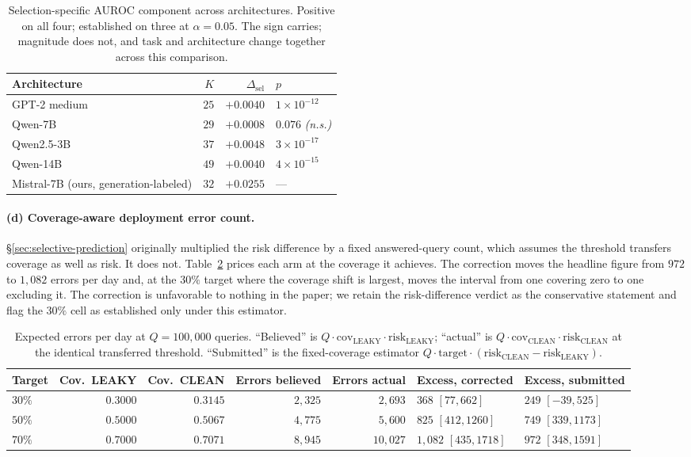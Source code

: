 \documentclass{article}
\begin{document}
\begin{table}[h]
\centering
\small
\begin{tabular}{@{}lrrl@{}}
\toprule
Architecture & $K$ & $\Delta_\text{sel}$ & $p$ \\
\midrule
GPT-2 medium & $25$ & $+0.0040$ & $1{\times}10^{-12}$ \\
Qwen-7B      & $29$ & $+0.0008$ & $0.076$ \emph{(n.s.)} \\
Qwen2.5-3B   & $37$ & $+0.0048$ & $3{\times}10^{-17}$ \\
Qwen-14B     & $49$ & $+0.0040$ & $4{\times}10^{-15}$ \\
\midrule
Mistral-7B (ours, generation-labeled) & $32$ & $+0.0255$ & --- \\
\bottomrule
\end{tabular}
\caption{Selection-specific AUROC component across architectures. Positive on
all four; established on three at $\alpha=0.05$. The sign carries; magnitude
does not, and task and architecture change together across this comparison.}
\label{tab:arch}
\end{table}

\paragraph{(d) Coverage-aware deployment error count.}
\S\ref{sec:selective-prediction} originally multiplied the risk difference by a
fixed answered-query count, which assumes the threshold transfers coverage as
well as risk. It does not. Table~\ref{tab:deploy} prices each arm at the
coverage it achieves. The correction moves the headline figure from $972$ to
$1{,}082$ errors per day and, at the $30\%$ target where the coverage shift is
largest, moves the interval from one covering zero to one excluding it. The
correction is unfavorable to nothing in the paper; we retain the
risk-difference verdict as the conservative statement and flag the $30\%$ cell
as established only under this estimator.

\begin{table}[h]
\centering
\small
{\setlength{\tabcolsep}{4pt}
\begin{tabular}{@{}lrrrrll@{}}
\toprule
Target & Cov.\ LEAKY & Cov.\ CLEAN & Errors believed & Errors actual & Excess, corrected & Excess, submitted \\
\midrule
$30\%$ & $0.3000$ & $0.3145$ & $2{,}325$ & $2{,}693$ & $368$ $[77,662]$ & $249$ $[-39,525]$ \\
$50\%$ & $0.5000$ & $0.5067$ & $4{,}775$ & $5{,}600$ & $825$ $[412,1260]$ & $749$ $[339,1173]$ \\
$70\%$ & $0.7000$ & $0.7071$ & $8{,}945$ & $10{,}027$ & $1{,}082$ $[435,1718]$ & $972$ $[348,1591]$ \\
\bottomrule
\end{tabular}}
\caption{Expected errors per day at $Q=100{,}000$ queries. ``Believed'' is
$Q\cdot\text{cov}_\text{LEAKY}\cdot\text{risk}_\text{LEAKY}$; ``actual'' is
$Q\cdot\text{cov}_\text{CLEAN}\cdot\text{risk}_\text{CLEAN}$ at the identical
transferred threshold. ``Submitted'' is the fixed-coverage estimator
$Q\cdot\text{target}\cdot(\text{risk}_\text{CLEAN}-\text{risk}_\text{LEAKY})$.}
\label{tab:deploy}
\end{table}
\end{document}
